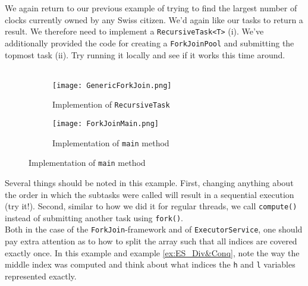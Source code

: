 \documentclass[main.tex]{subfiles}
\begin{document}
\begin{example}
    We again return to our previous example of trying to find the largest number of clocks currently owned by any Swiss citizen. We'd again like our tasks to return a result. We therefore need to implement a \texttt{RecursiveTask<T>} (i). We've additionally provided the code for creating a \texttt{ForkJoinPool} and submitting the topmost task (ii). Try running it locally and see if it works this time around. \\
    \\
    \begin{figure}[H]
        \centering
        \begin{subfigure}{.5\textwidth}
            \centering
            \texttt{[image: GenericForkJoin.png]}
            \caption{Implemention of \texttt{RecursiveTask}}
        \end{subfigure}%
        \begin{subfigure}{.5\textwidth}
            \centering
            \texttt{[image: ForkJoinMain.png]}
            \caption{Implementation of \texttt{main} method}
        \end{subfigure}
    \end{figure}
    \noindent Several things should be noted in this example. First, changing anything about the order in which the subtasks were called will result in a sequential execution (try it!). Second, similar to how we did it for regular threads, we call \texttt{compute()} instead of submitting another task using \texttt{fork()}.\\
    Both in the case of the \texttt{ForkJoin}-framework and of \texttt{ExecutorService}, one should pay extra attention as to how to split the array such that all indices are covered exactly once. In this example and example \ref{ex:ES_Div&Conq}, note the way the middle index was computed and think about what indices the \texttt{h} and \texttt{l} variables represented exactly.
\end{example}
\pagebreak
\end{document}
